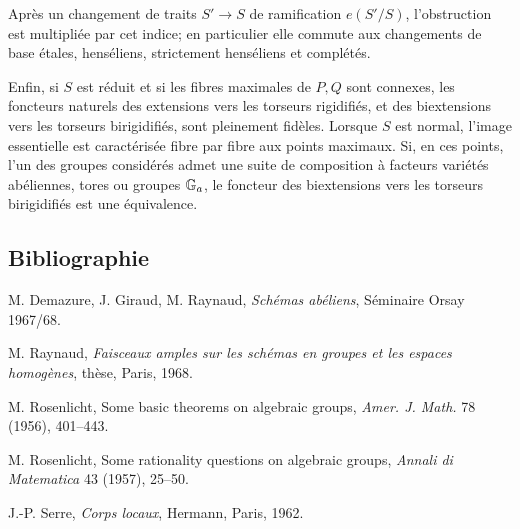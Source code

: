 \documentclass[11pt]{article}
\providecommand{\Ql}{\mathbb Q_\ell}
\begin{document}
Après un changement de traits \(S'\to S\) de ramification \(e(S'/S)\), l'obstruction est multipliée par cet indice; en particulier elle commute aux changements de base étales, henséliens, strictement henséliens et complétés.

Enfin, si \(S\) est réduit et si les fibres maximales de \(P,Q\) sont connexes, les foncteurs naturels des extensions vers les torseurs rigidifiés, et des biextensions vers les torseurs birigidifiés, sont pleinement fidèles.  Lorsque \(S\) est normal, l'image essentielle est caractérisée fibre par fibre aux points maximaux.  Si, en ces points, l'un des groupes considérés admet une suite de composition à facteurs variétés abéliennes, tores ou groupes \(\mathbb G_a\), le foncteur des biextensions vers les torseurs birigidifiés est une équivalence.

\subsection*{Bibliographie}
\begin{enumerate}[label={[\arabic*]}]
\item M. Demazure, J. Giraud, M. Raynaud, \emph{Schémas abéliens}, Séminaire Orsay 1967/68.
\item M. Raynaud, \emph{Faisceaux amples sur les schémas en groupes et les espaces homogènes}, thèse, Paris, 1968.
\item M. Rosenlicht, Some basic theorems on algebraic groups, \emph{Amer. J. Math.} 78 (1956), 401--443.
\item M. Rosenlicht, Some rationality questions on algebraic groups, \emph{Annali di Matematica} 43 (1957), 25--50.
\item J.-P. Serre, \emph{Corps locaux}, Hermann, Paris, 1962.
\end{enumerate}



\providecommand{\NS}{\operatorname{NS}}
\providecommand{\Biext}{\operatorname{Biext}}
\providecommand{\rk}{\operatorname{rk}}
\providecommand{\Car}{\operatorname{char}}
\providecommand{\BT}{\operatorname{BT}}
\providecommand{\cW}{\mathcal W}
\providecommand{\cL}{\mathcal L}
\providecommand{\cT}{\mathcal T}
\providecommand{\cU}{\mathcal U}
\providecommand{\cB}{\mathcal B}
\providecommand{\cA}{\mathcal A}
\providecommand{\Id}{\operatorname{Id}}
\providecommand{\I}{I}
\providecommand{\Tate}{T}
\providecommand{\Ph}{\Phi}
\providecommand{\Zell}{\mathbb Z_\ell}
\providecommand{\Ql}{\mathbb Q_\ell}
\providecommand{\Gmk}{\mathbb G_m}
\end{document}
